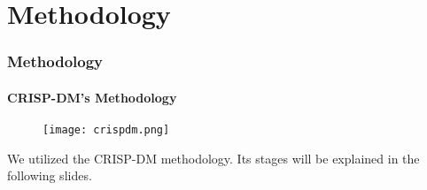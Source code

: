 \begin{frame}
\begin{thebibliography}{99}
		 
		
 
		
		

		
		
		
		
		\normalsize		 

	\end{thebibliography}

	
	
\end{frame}
\section{Methodology}

\begin{frame}
	\frametitle{Methodology}
	\framesubtitle{CRISP-DM's Methodology}	
	\begin{figure}
		\texttt{[image: crispdm.png]}
	\end{figure}

	\begin{block}{}
	\scriptsize
		We utilized the CRISP-DM methodology. Its stages will be explained in the following slides.	
	\end{block}	
\end{frame}


